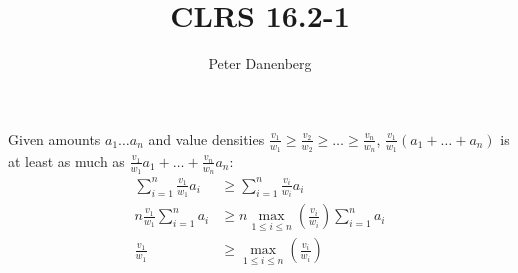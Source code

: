 \documentclass{article}
\title{CLRS 16.2-1}
\author{Peter Danenberg}
\begin{document}
\maketitle
Given amounts \(a_1 \dots a_n\) and value densities \(\frac{v_1}{w_1}
    \geq \frac{v_2}{w_2} \geq \dots \geq \frac{v_n}{w_n}\),
 \(\frac{v_1}{w_1}\left(a_1 + \dots + a_n\right)\) is at least as much as \(\frac{v_1}{w_1}a_1 + \dots + \frac{v_n}{w_n}a_n\):
\begin{align}
  \sum_{i=1}^n\frac{v_1}{w_1}a_i &\geq \sum_{i=1}^n\frac{v_i}{w_i}a_i\\
  n\frac{v_1}{w_1}\sum_{i=1}^na_i &\geq n\max_{1 \leq i \leq n}(\frac{v_i}{w_i})\sum_{i=1}^na_i\\
  \frac{v_1}{w_1} &\geq \max_{1 \leq i \leq n}(\frac{v_i}{w_i})
\end{align}
\end{document}
